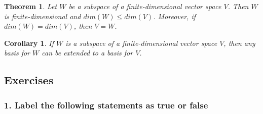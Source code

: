 \documentclass{article}
\newtheorem{theorem}{Theorem}
\newtheorem*{corollary}{Corollary}
\begin{document}
\begin{theorem}
    Let $W$ be a subspace of a finite-dimensional vector space $V$. Then $W$ is finite-dimensional and $dim(W)\le dim(V)$. Moreover, if $dim(W)=dim(V)$, then $V=W$.
\end{theorem}

\begin{corollary}
    If $W$ is a subspace of a finite-dimensional vector space $V$, then any basis for $W$ can be extended to a basis for $V$.
\end{corollary}

\subsection{Exercises}

\subsubsection*{1. Label the following statements as true or false}
\end{document}
